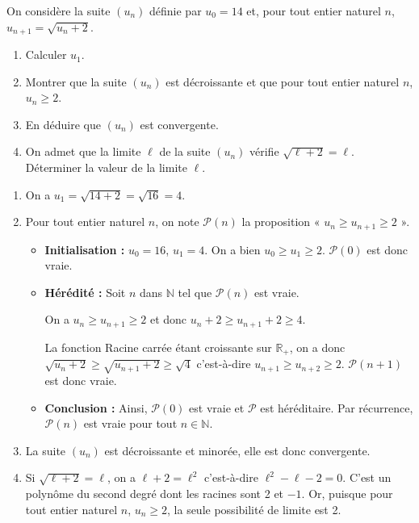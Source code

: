 \documentclass[11pt,fleqn, openany]{book} %
\begin{document}
\begin{exercise}[topic=lim13]On considère la suite $(u_n)$ définie par $u_0=14$ et, pour tout entier naturel $n$, $u_{n+1}=\sqrt{u_n+2}$.
\begin{enumerate}
\item Calculer $u_1$.
\item Montrer que la suite $(u_n)$ est décroissante et que pour tout entier naturel $n$, $u_n \geqslant 2$.
\item En déduire que $(u_n)$ est convergente.
\item On admet que la limite $\ell$ de la suite $(u_n)$ vérifie $\sqrt{\ell+2}=\ell$. Déterminer la valeur de la limite $\ell$.
\end{enumerate}\end{exercise}

\begin{solution}\hspace{0pt}
\begin{enumerate}
\item On a $u_1=\sqrt{14+2}=\sqrt{16}=4$.

\item Pour tout entier naturel $n$, on note $\mathcal{P}(n)$ la proposition « $u_n\geqslant u _{n+1} \geqslant 2$ ».

\begin{itemize}
\item \textbf{Initialisation :} $u_0=16$, $u_1=4$. On a bien $u_0 \geqslant u_1 \geqslant 2$. $\mathcal{P}(0)$ est donc vraie.
\item \textbf{Hérédité :} Soit $n$ dans $\mathbb{N}$ tel que $\mathcal{P}(n)$ est vraie. 

On a $u_n\geqslant u _{n+1} \geqslant 2$ et donc $u_n+2\geqslant u _{n+1}+2 \geqslant 4$.

La fonction Racine carrée étant croissante sur $\mathbb{R}_+$, on a donc $\sqrt{u_n+2}\geqslant \sqrt{u_{n+1}+2} \geqslant \sqrt{4}$ c'est-à-dire $u_{n+1}\geqslant u _{n+2} \geqslant 2$. $\mathcal{P}(n+1)$ est donc vraie.
\item \textbf{Conclusion :} Ainsi, $\mathcal{P}(0)$ est vraie et $\mathcal{P}$ est héréditaire. Par récurrence, $\mathcal{P}(n)$ est vraie pour tout $n\in\mathbb{N}$.
\end{itemize}

\item La suite $(u_n)$ est décroissante et minorée, elle est donc convergente.

\item Si $\sqrt{\ell+2}=\ell$, on a $\ell+2=\ell^2$ c'est-à-dire $\ell^2-\ell-2=0$. C'est un polynôme du second degré dont les racines sont 2 et $-1$. Or, puisque pour tout entier naturel $n$, $u_n \geqslant 2$, la seule possibilité de limite est 2.\end{enumerate}\end{solution}
\end{document}
